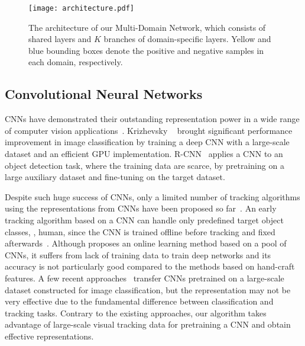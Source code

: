 \documentclass[10pt,twocolumn,letterpaper]{article}
\begin{document}
\begin{figure*}
\begin{center}
\texttt{[image: architecture.pdf]}
\end{center}
\vspace{-6mm}
   \caption{The architecture of our Multi-Domain Network, which consists of shared layers and $K$ branches of domain-specific layers. Yellow and blue bounding boxes denote the positive and negative samples in each domain, respectively.}
\label{fig:arch}
\end{figure*}

\subsection{Convolutional Neural Networks}
CNNs have demonstrated their outstanding representation power in a wide range of computer vision applications~\cite{krizhevsky2012imagenet,chatfield2014return,SimonyanICLR15,girshick2014rich,long2014fully,toshev2014deeppose,taigman2014deepface}.  
Krizhevsky \etal~\cite{krizhevsky2012imagenet} brought significant performance improvement in image classification by training a deep CNN with a large-scale dataset and an efficient GPU implementation. 
R-CNN~\cite{girshick2014rich} applies a CNN to an object detection task, where the training data are scarce, by pretraining on a large auxiliary dataset and fine-tuning on the target dataset. 

Despite such huge success of CNNs, only a limited number of tracking algorithms using the representations from CNNs have been proposed so far~\cite{fan2010human,hong2015online,li122014deeptrack,wang2015transferring}.
An early tracking algorithm based on a CNN can handle only predefined target object classes, \eg, human, since the CNN is trained offline before tracking and fixed afterwards~\cite{fan2010human}.
Although \cite{li122014deeptrack} proposes an online learning method based on a pool of CNNs, it suffers from lack of training data to train deep networks and its accuracy is not particularly good compared to the methods based on hand-craft features.
A few recent approaches~\cite{wang2015transferring,hong2015online} transfer CNNs pretrained on a large-scale dataset constructed for image classification, but the representation may not be very effective due to the fundamental difference between classification and tracking tasks. 
Contrary to the existing approaches, our algorithm takes advantage of large-scale visual tracking data for pretraining a CNN and obtain effective representations.
\end{document}

